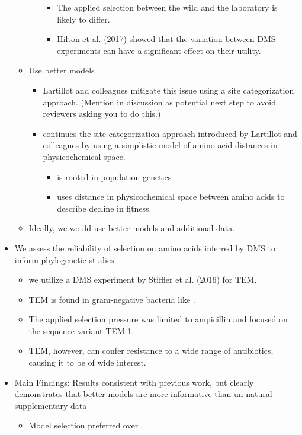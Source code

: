 \documentclass[12pt]{article}
\begin{document}
\begin{itemize}
\begin{itemize}
\begin{itemize}
\begin{itemize}
				\item The applied selection between the wild and the laboratory is likely to differ.
				\item Hilton et al. (2017) showed that the variation between DMS experiments can have a significant effect on their utility.
			\end{itemize}
		\end{itemize}
		\item Use better models
		\begin{itemize}
			\item Lartillot and colleagues mitigate this issue using a site categorization approach. (Mention in discussion as potential next step to avoid reviewers asking you to do this.)
			\item \selac continues the site categorization approach introduced by Lartillot and colleagues by using a simplistic model of amino acid distances in physicochemical space.
			\begin{itemize}
				\item \selac is rooted in population genetics
				\item \selac uses distance in physicochemical space between amino acids to describe decline in fitness.
			\end{itemize}        
		\end{itemize}
		\item Ideally, we would use better models and additional data.
	\end{itemize}
	\item We assess the reliability of selection on amino acids inferred by DMS to inform phylogenetic studies.
	\begin{itemize}
		\item we utilize a DMS experiment by Stiffler et al. (2016) for TEM.
		\item TEM is found in gram-negative bacteria like \ecoli.
		\item The applied selection pressure was limited to ampicillin and focused on the sequence variant TEM-1.
		\item TEM, however, can confer resistance to a wide range of antibiotics, causing it to be of wide interest.
	\end{itemize}
      \item Main Findings: Results consistent with previous work, but clearly demonstrates that better models are more informative than un-natural supplementary data        
	\begin{itemize}
        \item Model selection preferred \selac over \phydms.

\end{itemize}
\end{itemize}
\end{document}
